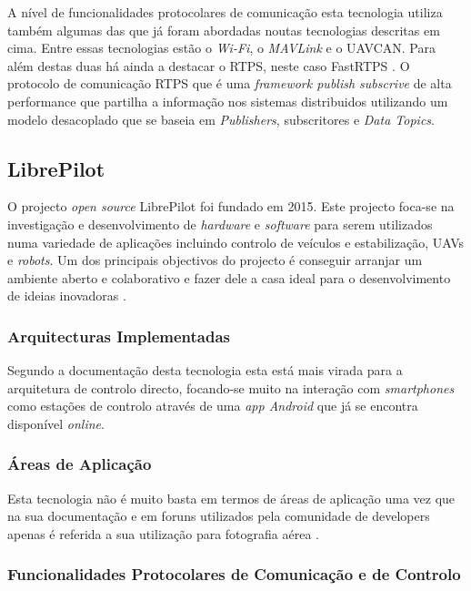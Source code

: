 A nível de funcionalidades protocolares de comunicação esta tecnologia utiliza também algumas das que já foram abordadas noutas tecnologias descritas em cima. Entre essas tecnologias estão o \textit{Wi-Fi}, o \textit{MAVLink} e o UAVCAN. Para além destas duas há ainda a destacar o RTPS, neste caso FastRTPS \cite{DronecodeProject}. O protocolo de comunicação RTPS que é uma \textit{framework publish subscrive} de alta performance que partilha a informação nos sistemas distribuidos utilizando um modelo desacoplado que se baseia em \textit{Publishers}, subscritores e \textit{Data Topics}\cite{EProsima}.

\subsection{LibrePilot}

O projecto \textit{open source} LibrePilot foi fundado em 2015. Este projecto foca-se na investigação e desenvolvimento de \textit{hardware} e \textit{software} para serem utilizados numa variedade de aplicações incluindo controlo de veículos e estabilização, UAVs e \textit{robots}. Um dos principais objectivos do projecto é conseguir arranjar um ambiente aberto e colaborativo e fazer dele a casa ideal para o desenvolvimento de ideias inovadoras \cite{LibrePilot}.

\subsubsection{Arquitecturas Implementadas}

Segundo a documentação desta tecnologia esta está mais virada para a arquitetura de controlo directo, focando-se muito na interação com \textit{smartphones} como estações de controlo através de uma \textit{app Android} que já se encontra disponível \textit{online}\cite{LibrePilot}.

\subsubsection{Áreas de Aplicação}

Esta tecnologia não é muito basta em termos de áreas de aplicação uma vez que na sua documentação e em foruns utilizados pela comunidade de developers apenas é referida a sua utilização para fotografia aérea \cite{LibrePilot}.

\subsubsection{Funcionalidades Protocolares de Comunicação e de Controlo}

